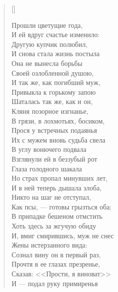\begin{verse}[\versewidth]
\begin{patverse*}
Прошли цветущие года,\\
И ей вдруг счастье изменило:\\
Другую купчик полюбил,\\
И снова стала жизнь постыла\ldotst\\
Она не вынесла борьбы\\
Своей озлобленной душою,\\
И так же, как погибший муж,\\
Привыкла к горькому запою\ldotst\\
Шаталась так же, как и он,\\
Кляня позорное изгнанье,\\
В грязи, в лохмотьях, босиком,\\
Прося у встречных подаянья\ldotst\\
Их с мужем вновь судьба свела\\
В углу вонючего подвала\ldotse\\
Взглянули ей в беззубый рот\\
Глаза голодного шакала\ldotst\\
Но страх пропал минувших лет,\\
И в ней теперь дышала злоба,\\
Никто на шаг не отступал,\\
Как псы, --- готовы грызться оба;\\
В припадке бешеном отмстить\\
Хоть здесь за жгучую обиду\ldotst\\
И, вмиг смирившись, муж не снес\\
Жены истерзанного вида:\\
Сознал вину он в первый раз,\\
Прочтя в ее глазах презренье,\\
Сказав: <<Прости, я виноват>>\ldotst\\
И --- подал руку примиренья\ldotst
\end{patverse*}
\end{verse}

\newpage
\vspace*{0cm}



